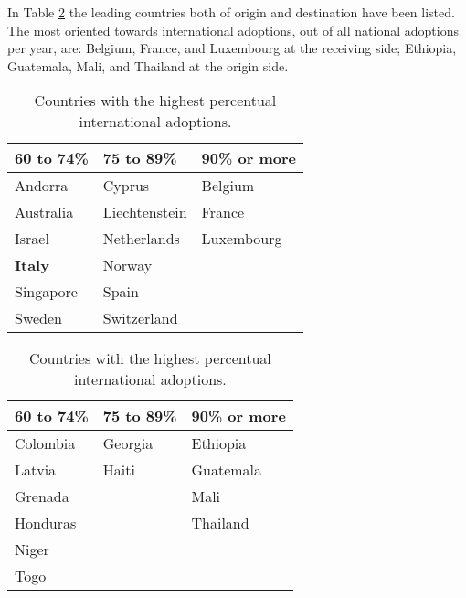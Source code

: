 
In Table \ref{tab:intadoptpercentcountries} the leading countries both of origin and destination have been listed. The most oriented towards international adoptions, out of all national adoptions per year, are: Belgium, France, and Luxembourg at the receiving side; Ethiopia, Guatemala, Mali, and Thailand at the origin side.

\begin{table}[H]
    \begin{subtable}[h]{0.45\textwidth}
        \centering
        \begin{tabular}{l l l}
        60 to 74\% & 75 to 89\% & 90\% or more\\
        \hline
        Andorra & Cyprus & Belgium\\
        Australia & Liechtenstein & France\\
        Israel & Netherlands & Luxembourg\\
        \textcolor{BrickRed}{\textbf{Italy}} & Norway & \\
        Singapore & Spain & \\
        Sweden & Switzerland & \\
        \end{tabular}
        \caption{Receiving countries}
        \label{tab:receivingcountries}
    \end{subtable}
    \hfill
    \begin{subtable}[h]{0.45\textwidth}
        \centering
        \begin{tabular}{l l l}
        60 to 74\% & 75 to 89\% & 90\% or more\\
        \hline
        Colombia & Georgia & Ethiopia\\
        Latvia & Haiti & Guatemala\\
        Grenada &  & Mali\\
        Honduras &  & Thailand\\
        Niger &  & \\
        Togo &  & \\
        \end{tabular}
        \caption{Countries of origin}
        \label{tab:countriesoforigin}
    \end{subtable}
    \caption{Countries with the highest percentual international adoptions.}
    \label{tab:intadoptpercentcountries}
\end{table}

